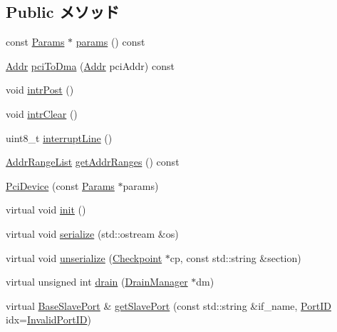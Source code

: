 \subsection*{Public メソッド}
\begin{DoxyCompactItemize}
\item 
const \hyperlink{classPciDevice_aefbfd3f2d9daf3173b779eeff32e8112}{Params} $\ast$ \hyperlink{classPciDevice_acd3c3feb78ae7a8f88fe0f110a718dff}{params} () const 
\item 
\hyperlink{base_2types_8hh_af1bb03d6a4ee096394a6749f0a169232}{Addr} \hyperlink{classPciDevice_a87078b3d3a28ae134f6736337e90dac3}{pciToDma} (\hyperlink{base_2types_8hh_af1bb03d6a4ee096394a6749f0a169232}{Addr} pciAddr) const 
\item 
void \hyperlink{classPciDevice_aba6fa755ca152cedafeb4150da6a2493}{intrPost} ()
\item 
void \hyperlink{classPciDevice_ac02b8a3b8685eca8bb4b237b29dfc762}{intrClear} ()
\item 
uint8\_\-t \hyperlink{classPciDevice_a439bff27e8dc8a1b3a8b04aaf8bf7a10}{interruptLine} ()
\item 
\hyperlink{classstd_1_1list}{AddrRangeList} \hyperlink{classPciDevice_a36cf113d5e5e091ebddb32306c098fae}{getAddrRanges} () const 
\item 
\hyperlink{classPciDevice_ab3ecd08d152a6a949c1e6a2d48a9afd5}{PciDevice} (const \hyperlink{classPciDevice_aefbfd3f2d9daf3173b779eeff32e8112}{Params} $\ast$params)
\item 
virtual void \hyperlink{classPciDevice_a02fd73d861ef2e4aabb38c0c9ff82947}{init} ()
\item 
virtual void \hyperlink{classPciDevice_a53e036786d17361be4c7320d39c99b84}{serialize} (std::ostream \&os)
\item 
virtual void \hyperlink{classPciDevice_af22e5d6d660b97db37003ac61ac4ee49}{unserialize} (\hyperlink{classCheckpoint}{Checkpoint} $\ast$cp, const std::string \&section)
\item 
virtual unsigned int \hyperlink{classPciDevice_aa8a18d230dba7a674ac8a0b4f35bc36a}{drain} (\hyperlink{classDrainManager}{DrainManager} $\ast$dm)
\item 
virtual \hyperlink{classBaseSlavePort}{BaseSlavePort} \& \hyperlink{classPciDevice_a4edba7d5e567b66fcd93297802a97077}{getSlavePort} (const std::string \&if\_\-name, \hyperlink{base_2types_8hh_acef4d7d41cb21fdc252e20c04cd7bb8e}{PortID} idx=\hyperlink{base_2types_8hh_a65bf40f138cf863f0c5e2d8ca1144126}{InvalidPortID})
\end{DoxyCompactItemize}
